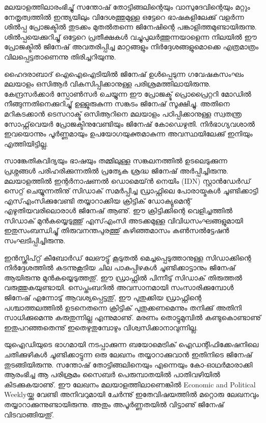 മലയാളത്തിലാരംഭിച്ചു് സന്തോഷ് തോട്ടിങ്ങലിന്റെയും വാസുദേവിന്റെയും മറ്റും നേതൃത്വത്തില്‍ ഇന്ത്യയിലും വിദേശത്തുമുള്ള ഒട്ടേറെ 
ഭാഷകളിലേക്കു് വളര്‍ന്ന ശില്‍പ്പ പ്രോജക്ടില്‍ തുടക്കം മുതല്‍തന്നെ ജിനേഷിന്റെ പങ്കാളിത്തമുണ്ടായിരുന്നു. ശില്‍പ്പയെക്കുറിച്ചു് 
ഒട്ടേറെ പ്രതീക്ഷകള്‍ വച്ചുപുലര്‍ത്തുന്നയാളെന്ന നിലയില്‍ ഈ പ്രോജക്ടില്‍ ജിനേഷ് അവതരിപ്പിച്ച മാറ്റങ്ങളും 
നിര്‍ദ്ദേശങ്ങളുമൊക്കെ എത്രമാത്രം വിലപ്പെട്ടതാണെന്നു തിരിച്ചറിയുന്നു.

ഹൈദരാബാദ് ഐഐഐടിയില്‍ ജിനേഷ് ഉള്‍പ്പെടുന്ന ഗവേഷകസംഘം മലയാളം ഒസിആര്‍ വികസിപ്പിക്കാനുള്ള 
പരിശ്രമത്തിലായിരുന്നു. കേന്ദ്രസര്‍ക്കാര്‍ സ്പോണ്‍സര്‍ ചെയ്യുന്ന ഈ പ്രോജക്ടു് പ്രൊപ്രൈറ്ററി മോഡില്‍ നീങ്ങുന്നതിനെക്കുറിച്ചു് 
ഉള്ളുരുകുന്ന സങ്കടം ജിനേഷ് സൂക്ഷിച്ചു. അതിനെ മറികടക്കാന്‍ ടെസറാക്ടു് ഒസിആറിനെ മലയാളം പഠിപ്പിക്കാനുള്ള സ്വതന്ത്ര 
സോഫ്റ്റ്‌വെയര്‍ പ്രോജക്ടിനുവേണ്ടിയും ജിനേഷ് കോഡെഴുതി. നിര്‍ഭാഗ്യവശാല്‍ ഇവയൊന്നും പൂര്‍ണ്ണമായും 
ഉപയോഗയുക്തമാകുന്ന അവസ്ഥയിലേക്കു് ഇനിയും എത്തിയിട്ടില്ല.

സാങ്കേതികവിദ്യയും ഭാഷയും തമ്മിലുള്ള സങ്കലനത്തില്‍ ഉടലെടുക്കുന്ന പ്രശ്നങ്ങള്‍ പരിഹരിക്കുന്നതില്‍ പ്രത്യേക ശ്രദ്ധ ജിനേഷ് 
അര്‍പ്പിച്ചിരുന്നു. മലയാളത്തില്‍ ഇന്റര്‍നാഷണല്‍ ഡൊമെയ്ന്‍ നെയിം (IDN) സ്റ്റാന്‍ഡേര്‍ഡ് സെറ്റ് ചെയ്യുന്നതിനു് സിഡാക്‍ 
സമര്‍പ്പിച്ച ഡ്രാഫ്റ്റിലെ പോരായ്മകള്‍ ചൂണ്ടിക്കാട്ടി എസ്എംസിക്കുവേണ്ടി തയ്യാറാക്കിയ ക്രിട്ടിക്‍ ഡോക്യുമെന്റ് 
എഴുതിയവരിലൊരാള്‍ ജിനേഷ് ആണു്. ഈ ക്രിട്ടിക്കിന്റെ വെളിച്ചത്തില്‍ സിഡാക്‍ മുന്‍കയ്യെടുത്തു് എസ്എംസി അടക്കമുള്ള 
വിവിധസംഘങ്ങളുമായി ഇതുസംബന്ധിച്ചു് തിരുവനന്തപുരത്തു് കഴിഞ്ഞമാസം കണ്‍സല്‍ട്ടേഷന്‍ സംഘടിപ്പിച്ചിരുന്നു.

ഇന്‍സ്ക്രിപ്റ്റ് കീബോര്‍ഡ് ലേഔട്ടു് കൂടുതല്‍ മെച്ചപ്പെടുത്താനുള്ള സിഡാക്കിന്റെ നിര്‍ദ്ദേശത്തില്‍ കടന്നുകൂടിയ ചില പാകപ്പിഴകള്‍ 
ചൂണ്ടിക്കാട്ടാനും ജിനേഷ് ആയിരുന്നു മുന്‍കയ്യെടുത്തതു്. ഈ ഡ്രാഫ്റ്റില്‍ പിന്നീടു് സിഡാക്‍ തിരുത്തല്‍ വരുത്തുകയുണ്ടായി. 
സെപ്തംബറില്‍ അവസാനമായി സംസാരിക്കുമ്പോള്‍ ജിനേഷ് എന്നോടു് ആവശ്യപ്പെട്ടതു്, ഈ പുതുക്കിയ ഡ്രാഫ്റ്റിന്റെ 
പശ്ചാത്തലത്തില്‍ ഉടനെതന്നെ ക്രിട്ടിക്‍ പുതുക്കണമെന്നും തനിക്കു് അതിനി സാധിക്കുമെന്നു കരുതുന്നില്ല എന്നുമാണു്. മരണം 
തൊട്ടുമുമ്പില്‍ കണ്ടുകൊണ്ടാണു് ഇതുപറഞ്ഞതെന്നു് ഇതെഴുതുമ്പോഴും വിശ്വസിക്കാനാവുന്നില്ല.

യുഐഡിയുടെ ഭാഗമായി നടപ്പാക്കുന്ന ബയോമെട്രിക്‍ ഐഡന്റിഫിക്കേഷനിലെ ചതിക്കുഴികള്‍ ചൂണ്ടിക്കാട്ടുന്ന ഒരു ലേഖനം 
തയ്യാറാക്കുവാന്‍ ഇതിനിടെ ജിനേഷ് തുടങ്ങിയിരുന്നു. സന്തോഷ് തോട്ടിങ്ങലിനെയും എന്നെയും കോ-ഓഥര്‍മാരാക്കി ആരംഭിച്ച 
ആ പരിശ്രമം സൈബര്‍ പെരുമ്പാതയില്‍ പാതിവഴിയില്‍ കിടക്കുകയാണു്. ഈ ലേഖനം മലയാളത്തിലാണെങ്കില്‍ 
Economic and Political Weeklyയ്ക്കു വേണ്ടി അനിവറുമായി ചേര്‍ന്നു് ഇതേവിഷയത്തില്‍ മറ്റൊരു ലേഖനവും 
തയ്യാറാക്കുന്നുണ്ടായിരുന്നു. അതും അപൂര്‍ണ്ണതയില്‍ വിട്ടാണു് ജിനേഷ് വിടവാങ്ങിയതു്.

